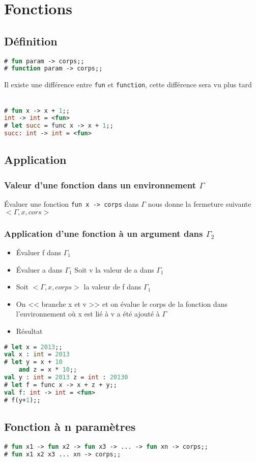 \documentclass[12pt,a4paper,openany]{book}
\begin{document}
\section{Fonctions}
\subsection{Définition}
	\begin{lstlisting}[language=Caml, caption=Sytaxe d'une définition de fonction]
# fun param -> corps;;		
# function param -> corps;;
\end{lstlisting}
		\begin{remarque}{Il existe une différence entre \texttt{fun} et \texttt{function}, cette différence sera vu plus tard}\\~\end{remarque}
			\begin{exemple}
	\begin{lstlisting}[language=Caml, caption=Sytaxe d'une définition de fonction, numbers=none]
# fun x -> x + 1;;		
int -> int = <fun>
# let succ = func x -> x + 1;; 
succ: int -> int = <fun>
\end{lstlisting}
				\end{exemple}
				\subsection{Application}
				\subsubsection{Valeur d'une fonction dans un environnement $\Gamma$}
				Évaluer une fonction \texttt{fun x -> corps} dans $\Gamma$ nous donne la fermeture suivante $<\Gamma, x, cors>$
				\subsubsection{Application d'une fonction à un argument dans $\Gamma_2$}
				\begin{itemize}
					\item Évaluer f dans $\Gamma_1$
					\item Évaluer a dans $\Gamma_1$ Soit v la valeur de a dans $\Gamma_1$
					\item Soit $<\Gamma, x, corps>$ la valeur de f dans $\Gamma_1$
					\item On << branche x et v >> et on évalue le corps de la fonction dans l'environnement où x est lié à v a été ajouté à $\Gamma$
					\item Résultat
				\end{itemize}
			\begin{exemple}
	\begin{lstlisting}[language=Caml, caption=Exemple d'utilisation de fonctions, numbers=none]
# let x = 2013;;
val x : int = 2013
# let y = x + 10
	and z = x * 10;;
val y : int = 2013 z = int : 20130
# let f = func x -> x + z + y;;
val f: int -> int = <fun>
# f(y+1);;
\end{lstlisting}
			\end{exemple}
			\subsection{Fonction à n paramètres}
	\begin{lstlisting}[language=Caml, caption=Sytaxe d'une définition de fonction à n paramètres, numbers=none]
# fun x1 -> fun x2 -> fun x3 -> ... -> fun xn -> corps;;
# fun x1 x2 x3 ... xn -> corps;;
\end{lstlisting}
\end{document}
